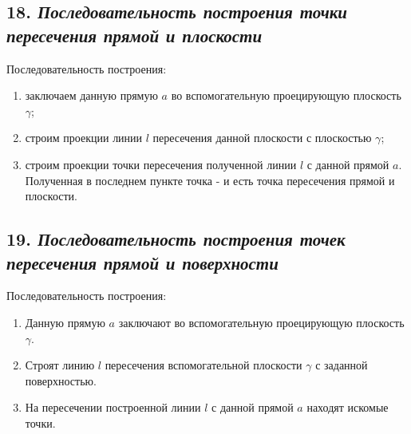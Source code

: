 
\newpage
\subsection*{18. \textit{Последовательность построения точки пересечения прямой и плоскости}}

\begin{mainQuote}
\end{mainQuote}

Последовательность построения:
\begin{enumerate}
    \item заключаем данную прямую $a$ во вспомогательную проецирующую плоскость $\gamma$;
    \item строим проекции линии $l$ пересечения данной плоскости с плоскостью $\gamma$;
    \item строим проекции точки пересечения полученной линии $l$ с данной прямой $a$.
Полученная в последнем пункте точка - и есть точка пересечения прямой и плоскости.
\end{enumerate}



\newpage
\subsection*{19. \textit{Последовательность построения точек пересечения прямой и поверхности}}

\begin{mainQuote}
\end{mainQuote}

Последовательность построения:
\begin{enumerate}
    \item Данную прямую $a$ заключают во вспомогательную проецирующую плоскость $\gamma$.
    \item Строят линию $l$ пересечения вспомогательной плоскости $\gamma$ с заданной поверхностью.
    \item На пересечении построенной линии $l$ с данной прямой $a$ находят искомые точки.
\end{enumerate}



